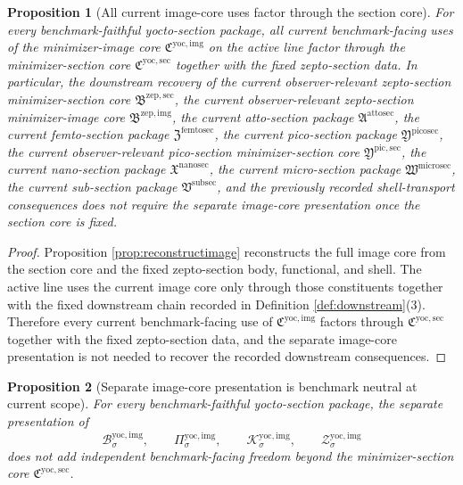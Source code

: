 \documentclass[11pt]{article}
\newcommand{\SubSectionPackage}{\mathfrak V^{\mathrm{subsec}}}
\newcommand{\MicroSectionPackage}{\mathfrak W^{\mathrm{microsec}}}
\newcommand{\NanoSectionPackage}{\mathfrak X^{\mathrm{nanosec}}}
\newcommand{\PicoSectionPackage}{\mathfrak Y^{\mathrm{picosec}}}
\newcommand{\PicoMinSectionCore}{\mathfrak Y^{\mathrm{pic,sec}}}
\newcommand{\FemtoSectionPackage}{\mathfrak Z^{\mathrm{femtosec}}}
\newcommand{\AttoSectionPackage}{\mathfrak A^{\mathrm{attosec}}}
\newcommand{\ZeptoImageCore}{\mathfrak B^{\mathrm{zep,img}}}
\newcommand{\ZeptoMinSectionCore}{\mathfrak B^{\mathrm{zep,sec}}}
\newcommand{\YoctoImageCore}{\mathfrak C^{\mathrm{yoc,img}}}
\newcommand{\YoctoImgBody}[1]{\mathcal B_{#1}^{\mathrm{yoc,img}}}
\newcommand{\YoctoImgProj}[1]{\Pi_{#1}^{\mathrm{yoc,img}}}
\newcommand{\YoctoImgFunctional}[1]{\mathscr K_{#1}^{\mathrm{yoc,img}}}
\newcommand{\YoctoImgShell}[1]{\mathcal Z_{#1}^{\mathrm{yoc,img}}}
\newcommand{\YoctoMinSectionCore}{\mathfrak C^{\mathrm{yoc,sec}}}
\newtheorem{proposition}{Proposition}
\begin{document}
\begin{proposition}[All current image-core uses factor through the section core]
\label{prop:downstream}
For every benchmark-faithful yocto-section package, all current benchmark-facing uses of the minimizer-image core \(\YoctoImageCore\) on the active line factor through the minimizer-section core \(\YoctoMinSectionCore\) together with the fixed zepto-section data. In particular, the downstream recovery of the current observer-relevant zepto-section minimizer-section core \(\ZeptoMinSectionCore\), the current observer-relevant zepto-section minimizer-image core \(\ZeptoImageCore\), the current atto-section package \(\AttoSectionPackage\), the current femto-section package \(\FemtoSectionPackage\), the current pico-section package \(\PicoSectionPackage\), the current observer-relevant pico-section minimizer-section core \(\PicoMinSectionCore\), the current nano-section package \(\NanoSectionPackage\), the current micro-section package \(\MicroSectionPackage\), the current sub-section package \(\SubSectionPackage\), and the previously recorded shell-transport consequences does not require the separate image-core presentation once the section core is fixed.
\end{proposition}

\begin{proof}
Proposition \ref{prop:reconstructimage} reconstructs the full image core from the section core and the fixed zepto-section body, functional, and shell. The active line uses the current image core only through those constituents together with the fixed downstream chain recorded in Definition \ref{def:downstream}(3). Therefore every current benchmark-facing use of \(\YoctoImageCore\) factors through \(\YoctoMinSectionCore\) together with the fixed zepto-section data, and the separate image-core presentation is not needed to recover the recorded downstream consequences.
\end{proof}

\begin{proposition}[Separate image-core presentation is benchmark neutral at current scope]
\label{prop:neutral}
For every benchmark-faithful yocto-section package, the separate presentation of
\[
\YoctoImgBody{\sigma},
\qquad
\YoctoImgProj{\sigma},
\qquad
\YoctoImgFunctional{\sigma},
\qquad
\YoctoImgShell{\sigma}
\]
does not add independent benchmark-facing freedom beyond the minimizer-section core \(\YoctoMinSectionCore\).
\end{proposition}
\end{document}
